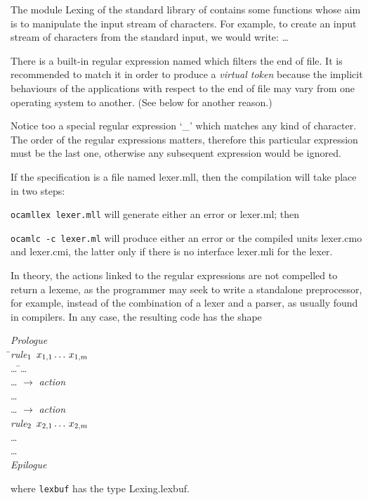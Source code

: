 The module \textsf{Lexing} of the standard library of \OCaml contains
some functions whose aim is to manipulate the input stream of
characters. For example, to create an input stream of characters from
the standard input, we would write: \Xlet {} \equal{}
  \Xin{} \ldots

There is a built\hyp{}in regular expression named  which
filters the end of file. It is recommended to match it in order to
produce a \emph{virtual token} \Teof because the implicit behaviours
of the applications with respect to the end of file may vary from one
operating system to another. (See below for another reason.)

Notice too a special regular expression `\textsf{\large \_}' which
matches any kind of character. The order of the regular expressions
matters, therefore this particular expression must be the last one,
otherwise any subsequent expression would be ignored.

If the \ocamllex specification is a file named \textsf{lexer.mll},
then the compilation will take place in two steps:
\begin{enumerate*}

   \item \texttt{ocamllex lexer.mll} will generate either an error or
     \textsf{lexer.ml}; then

   \item \texttt{ocamlc -c lexer.ml} will produce either an error or
     the compiled units \textsf{lexer.cmo} and \textsf{lexer.cmi}, the
     latter only if there is no interface \textsf{lexer.mli} for the
     lexer.

\end{enumerate*}
In theory, the actions linked to the regular expressions are not
compelled to return a lexeme, as the programmer may seek to write a
standalone preprocessor, for example, instead of the combination of a
lexer and a parser, as usually found in compilers. In any case, the
resulting \OCaml code has the shape
\begin{tabbing}
\emph{Prologue}\\
\Xlet \= \Xrec \emph{rule}\(\sb{1}\) \(x\sb{1,1} \dots\, x\sb{1,m}\)  \equal\\
\> \ldots{} \= \Xmatch \ldots{} \Xwith\\
\>\> \; \ldots{} \(\rightarrow\) \emph{action}\\
\>\> \vbar{} \ldots{}\\
\>\> \vbar{} \ldots{} \(\rightarrow\) \emph{action}\\
\Xand \emph{rule}\(\sb{2}\) \(x\sb{2,1} \dots\, x\sb{2,m}\)
 \equal\\
\> \ldots\\
\Xand \ldots\\
\emph{Epilogue}
\end{tabbing}
where \texttt{lexbuf} has the type \textsf{Lexing.lexbuf}.

